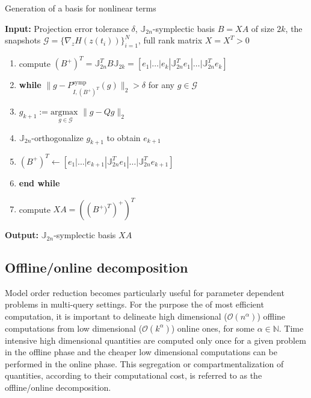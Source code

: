 \begin{algorithm} 
\caption{Generation of a basis for nonlinear terms} \label{alg:3}
{\bf Input:} Projection error tolerance $\delta$, $\mathbb J_{2n}$-symplectic basis $B = X A$ of size $2k$, the snapshots $\mathcal G = \{ \nabla_zH(z(t_i))\}_{i=1}^{N}$, full rank matrix $X=X^T>0$
\begin{enumerate}
\item compute $(B^+)^T = \mathbb J_{2n}^T B \mathbb J_{2k} = [e_1|\dots |e_{k} | \mathbb J_{2n}^Te_1|\dots| \mathbb J_{2n}^Te_{k}]$
\item \textbf{while} $\| g - P_{I,(B^+)^T}^{\text{symp}} (g) \|_2 > \delta$ for any $g \in \mathcal G$
\item \hspace{0.5cm} $g_{k+1} := \underset{g\in \mathcal G}{\text{argmax }} \| g -  Q g  \|_2$
\item \hspace{0.5cm} $\mathbb J_{2n}$-orthogonalize $g_{k+1}$ to obtain $e_{k+1}$
\item \hspace{0.5cm} $(B^+)^T \leftarrow [e_1|\dots |e_{k+1} | \mathbb J_{2n}^Te_1|\dots| \mathbb J_{2n}^Te_{k+1}]$
\item \textbf{end while}
\item compute $XA = \left( \left (B^+)^T \right)^+ \right)^T$
\end{enumerate}
\vspace{0.5cm}
{\bf Output:} $\mathbb J_{2n}$-symplectic basis $XA$
\end{algorithm}


\subsection{Offline/online decomposition} \label{sec:normmor.4}
Model order reduction becomes particularly useful for parameter dependent problems in multi-query settings. For the purpose the of most efficient computation, it is important to delineate high dimensional ($\mathcal{O}(n^{\alpha})$) offline computations from low dimensional ($\mathcal{O}(k^{\alpha})$) online ones, for some $\alpha \in \mathbb N$. Time intensive high dimensional quantities are computed only once for a given problem in the offline phase and the cheaper low dimensional computations can be performed in the online phase. This segregation or compartmentalization of quantities, according to their computational cost, is referred to as the offline/online decomposition.

